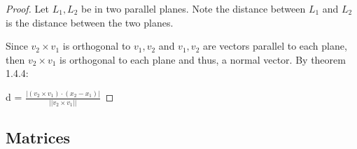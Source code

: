     \begin{proof}
        Let $L_1,L_2$ be in two parallel planes.
        Note the distance between $L_1$ and $L_2$ is the distance between
        the two planes.

        Since $v_2 \times v_1$ is orthogonal to $v_1,v_2$ and $v_1,v_2$ are
        vectors parallel to each plane, then $v_2 \times v_1$ is orthogonal to
        each plane and thus, a normal vector.
        By {\color{red} theorem 1.4.4}:

        \hspace{0.5cm}
        d = $\frac{| (v_2 \times v_1) \cdot (x_2-x_1) |}{||v_2 \times v_1||}$
    \end{proof}

    \newpage





\subsection{ Matrices }

